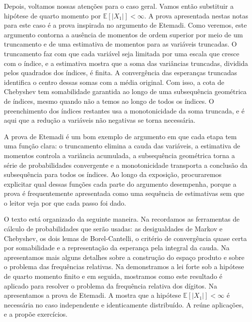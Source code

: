 \documentclass[12pt,portuguese]{article}
\theoremstyle{definition}
\theoremstyle{plainexercise}
\theoremstyle{starredexercise}
\theoremstyle{definition}
\begin{document}
Depois, voltamos nossas atenções para o caso geral. 
Vamos então substituir a hipótese de quarto momento por 
$\mathbb{E}[|X_1|]<\infty$. A prova apresentada nestas notas 
para este caso é a prova inspirada no argumento de Etemadi. Como veremos, este argumento
contorna a ausência de momentos de ordem superior por meio de um truncamento e de uma
estimativa de momentos para as variáveis truncadas. O truncamento faz com que
cada variável seja limitada por uma escala que cresce com o índice, e a
estimativa mostra que a soma das variâncias truncadas, dividida pelos
quadrados dos índices, é finita. A convergência das esperanças truncadas
identifica o centro dessas somas com a média original. Com isso, a cota de
Chebyshev tem somabilidade garantida ao longo de uma subsequência geométrica
de índices, mesmo quando não a temos ao longo de todos os índices. O
preenchimento dos índices restantes usa a monotonicidade da soma truncada, e é
aqui que a redução a variáveis não negativas se torna necessária.

A prova de Etemadi é um bom exemplo de argumento em que cada etapa tem uma
função clara: o truncamento elimina a cauda das variáveis, a estimativa de
momentos controla a variância acumulada, a subsequência geométrica torna a
série de probabilidades convergente e a monotonicidade transporta a conclusão
da subsequência para todos os índices. Ao longo da exposição, procuraremos
explicitar qual dessas funções cada parte do argumento desempenha, porque a prova é
frequentemente apresentada como uma sequência de estimativas sem que o leitor
veja por que cada passo foi dado.

O texto está organizado da seguinte maneira.
Na  recordamos
as ferramentas de cálculo de probabilidades que serão usadas: as desigualdades
de Markov e Chebyshev, os dois lemas de Borel-Cantelli, o critério de
convergência quase certa por somabilidade e a representação da esperança pela
integral da cauda. Na  apresentamos mais alguns detalhes 
sobre a construção do espaço produto e sobre o problema das frequências relativas. 
Na  demonstramos a lei forte sob a hipótese de quarto momento finito 
e em seguida, mostramos como este resultado é aplicado para resolver o problema
da frequência relativa dos dígitos. 
Na  apresentamos a prova de Etemadi.
A  mostra que a hipótese $\mathbb{E}[|X_1|]<\infty$ é
necessária no caso independente e identicamente distribuído.
A  reúne aplicações, e a  propõe exercícios.
\end{document}
